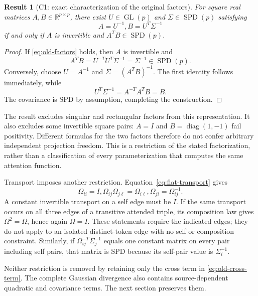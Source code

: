 \documentclass[11pt]{article}
\newtheorem{result}{Result}
\newcommand{\R}{\mathbb{R}}
\newcommand{\SPD}{\operatorname{SPD}}
\newcommand{\GL}{\operatorname{GL}}
\newcommand{\diag}{\operatorname{diag}}
\begin{document}
\begin{result}[C1: exact characterization of the original factors]
\label{res:C1}
For square real matrices $A,B\in\R^{p\times p}$, there exist $U\in\GL(p)$ and $\Sigma\in\SPD(p)$ satisfying
\begin{equation}
A=U^{-1}, B=U^T\Sigma^{-1}
\label{eq:old-factors}
\end{equation}
if and only if $A$ is invertible and $A^TB\in\SPD(p)$.
\end{result}
\begin{proof}
If \eqref{eq:old-factors} holds, then $A$ is invertible and
\begin{equation}
A^TB=U^{-T}U^T\Sigma^{-1}=\Sigma^{-1}\in\SPD(p).
\end{equation}
Conversely, choose $U=A^{-1}$ and $\Sigma=(A^TB)^{-1}$. The first identity follows immediately, while
\begin{equation}
U^T\Sigma^{-1}=A^{-T}A^TB=B.
\end{equation}
The covariance is SPD by assumption, completing the construction.
\end{proof}

The result excludes singular and rectangular factors from this representation. It also excludes some invertible square pairs: $A=I$ and $B=\diag(1,-1)$ fail positivity. Different formulas for the two factors therefore do not confer arbitrary independent projection freedom. This is a restriction of the stated factorization, rather than a classification of every parameterization that computes the same attention function.

Transport imposes another restriction. Equation~\eqref{eq:flat-transport} gives
\begin{equation}
\Omega_{ii}=I,
\Omega_{ij}\Omega_{j\ell}=\Omega_{i\ell},
\Omega_{ji}=\Omega_{ij}^{-1}.
\label{eq:cocycle}
\end{equation}
A constant invertible transport on a self edge must be $I$. If the same transport occurs on all three edges of a transitive attended triple, its composition law gives $\Omega^2=\Omega$, hence again $\Omega=I$. These statements require the indicated edges; they do not apply to an isolated distinct-token edge with no self or composition constraint. Similarly, if $\Omega_{ij}^{-T}\Sigma_j^{-1}$ equals one constant matrix on every pair including self pairs, that matrix is SPD because its self-pair value is $\Sigma_i^{-1}$.

Neither restriction is removed by retaining only the cross term in \eqref{eq:old-cross-term}. The complete Gaussian divergence also contains source-dependent quadratic and covariance terms. The next section preserves them.
\end{document}
